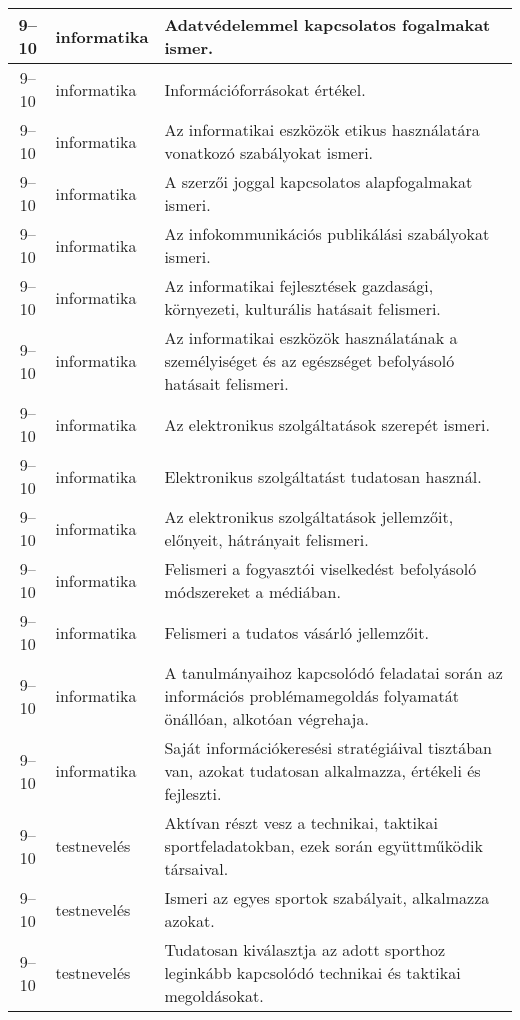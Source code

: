 \begin{small}
\begin{longtable}{c | p{2cm} |  p{11cm} }
              9--10 & informatika & Adatvédelemmel kapcsolatos fogalmakat ismer. \\ \hline
              9--10 & informatika & Információforrásokat értékel. \\ \hline
              9--10 & informatika & Az informatikai eszközök etikus használatára vonatkozó szabályokat ismeri. \\ \hline
              9--10 & informatika & A szerzői joggal kapcsolatos alapfogalmakat ismeri. \\ \hline
              9--10 & informatika & Az infokommunikációs publikálási szabályokat ismeri. \\ \hline
              9--10 & informatika & Az informatikai fejlesztések gazdasági, környezeti, kulturális hatásait felismeri. \\ \hline
              9--10 & informatika & Az informatikai eszközök használatának a személyiséget és az egészséget befolyásoló hatásait felismeri. \\ \hline
              9--10 & informatika & Az elektronikus szolgáltatások szerepét ismeri. \\ \hline
              9--10 & informatika & Elektronikus szolgáltatást tudatosan használ. \\ \hline
              9--10 & informatika & Az elektronikus szolgáltatások jellemzőit, előnyeit, hátrányait felismeri. \\ \hline
              9--10 & informatika & Felismeri a fogyasztói viselkedést befolyásoló módszereket a médiában. \\ \hline
              9--10 & informatika & Felismeri a tudatos vásárló jellemzőit. \\ \hline
              9--10 & informatika & A tanulmányaihoz kapcsolódó feladatai során az információs problémamegoldás folyamatát önállóan, alkotóan végrehaja. \\ \hline
              9--10 & informatika & Saját információkeresési stratégiáival tisztában van, azokat tudatosan alkalmazza, értékeli és fejleszti. \\ \hline
              9--10 & testnevelés & Aktívan részt vesz a technikai, taktikai sportfeladatokban, ezek során együttműködik társaival. \\ \hline
              9--10 & testnevelés & Ismeri az egyes sportok szabályait, alkalmazza azokat. \\ \hline
              9--10 & testnevelés & Tudatosan kiválasztja az adott sporthoz leginkább kapcsolódó technikai és taktikai megoldásokat. \\ \hline

\end{longtable}
\end{small}
